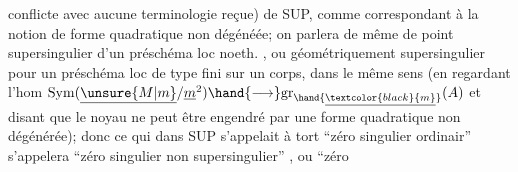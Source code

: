 conflicte avec aucune terminologie reçue)  de SUP,
comme correspondant à la notion de forme quadratique non dégénéée; on
parlera de même de point supersingulier d'un préschéma loc noeth. , ou
géométriquement supersingulier pour un préschéma loc de type fini sur un
corps, dans le même sens (en regardant l'hom $\mathrm{Sym}(\underline{\unsure{M|m}}/\underline{m}^2) \hand{\longrightarrow} \mathrm{gr}_{\hand{\underline{\textcolor{black}{m}}}}(A)$ et
 disant que le noyau ne peut être engendré par une forme quadratique
non dégénérée); donc ce qui dans SUP s'appelait à tort ``zéro singulier
ordinair'' s'appelera ``zéro singulier non supersingulier'' , ou ``zéro

